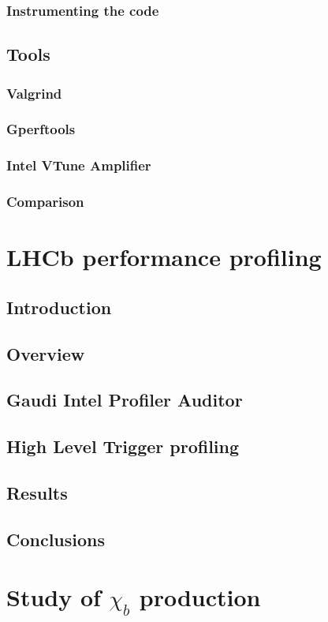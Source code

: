 \documentclass[12pt,a4paper]{article}
\begin{document}
\subsubsection{Instrumenting the code}
\subsection{Tools}
\subsubsection{Valgrind}
\subsubsection{Gperftools}
\subsubsection{Intel VTune Amplifier}
\subsubsection{Comparison}

\section{LHCb performance profiling}
\subsection{Introduction}
\subsection{Overview}
\subsection{Gaudi Intel Profiler Auditor}
\subsection{High Level Trigger profiling}
\subsection{Results}
\subsection{Conclusions}

\section{Study of $\chi_{b}$ production}
\end{document}
